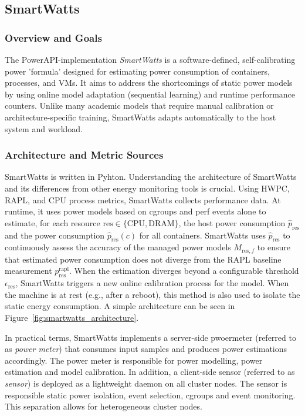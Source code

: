 \subsection{SmartWatts}
\label{sec:smartwatts}
\subsubsection{Overview and Goals}
\label{sec:smartwatts-overview}
The PowerAPI-implementation \textit{SmartWatts}\parencite{fieni2020smartwatts} is a software-defined, self-calibrating power 'formula' designed for estimating power consumption of containers, processes, and VMs. It aims to address the shortcomings of static power models by using online model adaptation (sequential learning) and runtime performance counters. Unlike many academic models that require manual calibration or architecture-specific training, SmartWatts adapts automatically to the host system and workload.
\subsubsection{Architecture and Metric Sources}
\label{sec:smartwatts-architecture}
SmartWatts is written in Pyhton. Understanding the architecture of SmartWatts and its differences from other energy monitoring tools is crucial. Using HWPC, RAPL, and CPU process metrics, SmartWatts collects performance data. At runtime, it uses power models based on cgroups and perf events alone to estimate, for each resource $\text{res} \in \{\text{CPU}, \text{DRAM}\}$, the host power consumption $\hat{p}_{\text{res}}$ and the power consumption $\hat{p}_{\text{res}}(c)$ for all containers. SmartWatts uses $\hat{p}_{\text{res}}$ to continuously assess the accuracy of the managed power models $M_{\text{res}, f}$ to ensure that estimated power consumption does not diverge from the RAPL baseline measurement $p_{\text{res}}^{\text{rapl}}$. When the estimation diverges beyond a configurable threshold $\epsilon_{\text{res}}$, SmartWatts triggers a new online calibration process for the model. When the machine is at rest (e.g., after a reboot), this method is also used to isolate the static energy consumption. A simple architecture can be seen in Figure~\ref{fig:smartwatts_architecture}.

In practical terms, SmartWatts implements a server-side pwoermeter (referred to as \textit{power meter}) that consumes input samples and produces power estimations accordingly. The power meter is responsible for power modelling, power estimation and model calibration. In addition, a client-side sensor (referred to as \textit{sensor}) is deployed as a lightweight daemon on all cluster nodes. The sensor is responsible static power isolation, event selection, cgroups and event monitoring. This separation allows for heterogeneous cluster nodes.

